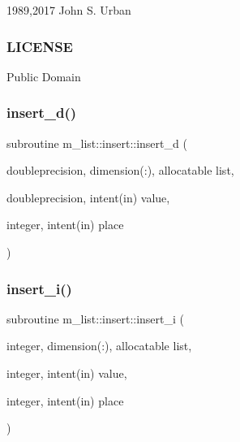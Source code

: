 1989,2017 John S. Urban \subsubsection*{L\+I\+C\+E\+N\+SE}

Public Domain \mbox{\label{interfacem__list_1_1insert_ae044e850bd7b5dae0d979e10110a8f1b}} 
\subsubsection{\texorpdfstring{insert\+\_\+d()}{insert\_d()}}
{\footnotesize\ttfamily subroutine m\+\_\+list\+::insert\+::insert\+\_\+d (\begin{DoxyParamCaption}\item[{doubleprecision, dimension(\+:), allocatable}]{list,  }\item[{doubleprecision, intent(in)}]{value,  }\item[{integer, intent(in)}]{place }\end{DoxyParamCaption})\hspace{0.3cm}{\ttfamily [private]}}

\mbox{\label{interfacem__list_1_1insert_ad841a688476fbbd90d735f42c69e1edf}} 
\subsubsection{\texorpdfstring{insert\+\_\+i()}{insert\_i()}}
{\footnotesize\ttfamily subroutine m\+\_\+list\+::insert\+::insert\+\_\+i (\begin{DoxyParamCaption}\item[{integer, dimension(\+:), allocatable}]{list,  }\item[{integer, intent(in)}]{value,  }\item[{integer, intent(in)}]{place }\end{DoxyParamCaption})\hspace{0.3cm}{\ttfamily [private]}}

\mbox{\label{interfacem__list_1_1insert_a00c923bee9588fb3f3089990dd24e096}} 
